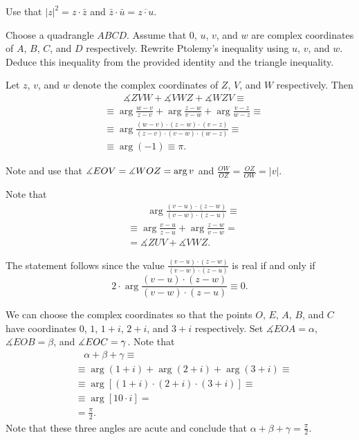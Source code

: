 \setcounter{eqtn}{0}

 Use that $|z|^2=z\cdot \bar z$ and $\bar z\cdot \bar u=\overline{z\cdot u}$.

Choose a quadrangle $ABCD$.
Assume that $0$, $u$, $v$, and $w$ are complex coordinates of $A$, $B$, $C$, and $D$ respectively.
Rewrite Ptolemy's inequality using $u$, $v$, and $w$.
Deduce this inequality from the provided identity and the triangle inequality.


Let $z$, $v$, and $w$ denote the complex coordinates of $Z$, $V$, and $W$ respectively.
Then 
\begin{align*}
&\qquad \measuredangle ZVW+\measuredangle VWZ+\measuredangle WZV\equiv
\\
&\equiv
\arg \tfrac{w-v}{z-v}+\arg \tfrac{z-w}{v-w}+\arg \tfrac{v-z}{w-z}\equiv
\\
&\equiv
\arg \tfrac{(w-v)\cdot(z-w)\cdot(v-z)}{(z-v)\cdot(v-w)\cdot(w-z)}\equiv
\\
&\equiv\arg (-1)\equiv
\pi.
\end{align*}

Note and use that 
$
\measuredangle EOV=\measuredangle WOZ=\arg v$
and
$\frac{OW}{OZ}=\frac{OZ}{OW}=|v|$.


Note that 
\begin{align*}
&\qquad\arg\frac{(v-u)\cdot(z-w)}{(v-w)\cdot(z-u)}\equiv
\\
&\equiv
\arg\frac{v-u}{z-u}
+
\arg\frac{z-w}{v-w}=
\\
&= \measuredangle ZUV+\measuredangle VWZ.
\end{align*}

The statement follows since the value $\tfrac{(v-u)\cdot(z-w)}{(v-w)\cdot(z-u)}$ is real if and only if 
\[2\cdot\arg\frac{(v-u)\cdot(z-w)}{(v-w)\cdot(z-u)}\equiv0.\]

We can choose the complex coordinates so that the points $O$, $E$, $A$, $B$, and $C$ have coordinates
$0$, $1$, $1+i$, $2+i$, and $3+i$ respectively.
Set $\measuredangle EOA=\alpha$, $\measuredangle EOB=\beta$, and $\measuredangle EOC=\gamma$.
Note that
\begin{align*}
&\ \ \ \ \alpha+\beta+\gamma\equiv
\\
&\equiv\arg(1+i)+\arg(2+i)+\arg(3+i)\equiv
\\
&\equiv\arg[(1+i)\cdot(2+i)\cdot(3+i)]\equiv
\\
&\equiv\arg [10\cdot i]=
\\
&=\tfrac\pi2.
\end{align*}
Note that these three angles are acute and conclude that $\alpha+\beta+\gamma=\tfrac\pi2$.

